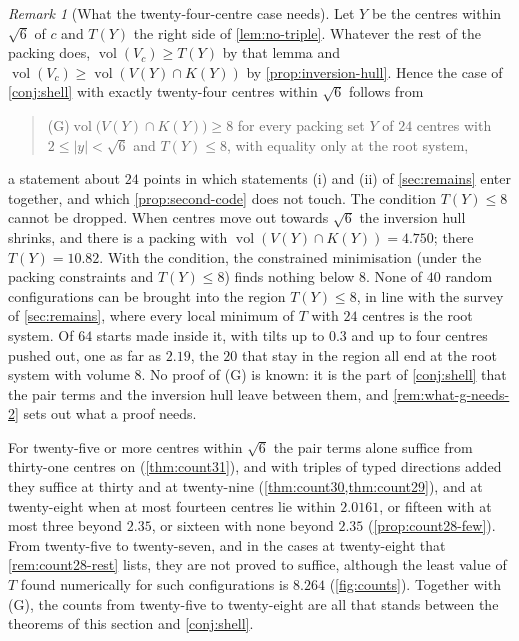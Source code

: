 \documentclass[11pt,reqno]{amsart}
\renewcommand{\_}{\origunderscore\allowbreak}
\numberwithin{equation}{section}
\theoremstyle{plain}
\theoremstyle{definition}
\theoremstyle{remark}
\newtheorem{remark}[thm]{Remark}
\DeclareMathOperator{\vol}{vol}
\begin{document}
\begin{remark}[What the twenty-four-centre case needs]\label{rem:what-g-needs}
Let $Y$ be the centres within $\sqrt6$ of $c$ and $T(Y)$ the right side of
\cref{lem:no-triple}. Whatever the rest of the packing does,
$\vol(V_c)\ge T(Y)$ by that lemma and $\vol(V_c)\ge\vol(V(Y)\cap K(Y))$ by
\cref{prop:inversion-hull}. Hence the case of \cref{conj:shell} with exactly
twenty-four centres within $\sqrt6$ follows from
\begin{quote}
(G)\quad $\vol\bigl(V(Y)\cap K(Y)\bigr)\ge8$ for every packing set $Y$ of $24$
centres with $2\le|y|<\sqrt6$ and $T(Y)\le8$, with equality only at the root
system,
\end{quote}
a statement about $24$ points in which statements (i) and (ii) of
\cref{sec:remains} enter together, and which \cref{prop:second-code} does
not touch. The condition $T(Y)\le8$ cannot be dropped. When centres move
out towards $\sqrt6$ the inversion hull shrinks, and there is a packing with
$\vol(V(Y)\cap K(Y))=4.750$; there $T(Y)=10.82$. With the condition, the
constrained minimisation (under the packing constraints and $T(Y)\le8$) finds
nothing below $8$. None of $40$ random configurations can be brought into
the region $T(Y)\le8$, in line with the survey of \cref{sec:remains}, where
every local minimum of $T$ with $24$ centres is the root system. Of $64$
starts made inside it, with tilts up to $0.3$ and up to four centres pushed
out, one as far as $2.19$, the $20$ that stay in the region all end at the
root system with volume $8$. No proof of (G) is known: it is the part of
\cref{conj:shell} that the pair terms and the inversion hull leave between
them, and \cref{rem:what-g-needs-2} sets out what a proof needs.
\end{remark}

For twenty-five or more centres within $\sqrt6$ the pair terms alone
suffice from thirty-one centres on (\cref{thm:count31}), and with triples
of typed directions added they suffice at thirty and at twenty-nine
(\cref{thm:count30,thm:count29}), and at twenty-eight when at most fourteen
centres lie within $2.0161$, or fifteen with at most three beyond $2.35$,
or sixteen with none beyond $2.35$
(\cref{prop:count28-few}). From twenty-five to twenty-seven,
and in the cases at twenty-eight that \cref{rem:count28-rest} lists, they
are not proved to suffice, although the least value of $T$ found numerically for
such configurations is $8.264$ (\cref{fig:counts}). Together with (G), the
counts from twenty-five to twenty-eight are all that stands between the
theorems of this section and
\cref{conj:shell}.
\end{document}
